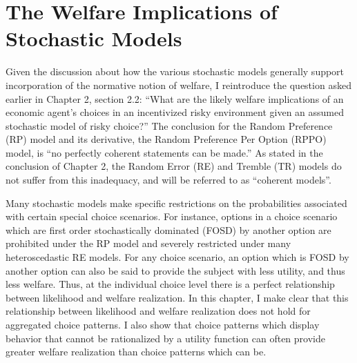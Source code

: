 \documentclass[../main.tex]{subfiles}
\begin{document}
\onehalfspacing
\setcounter{chapter}{2}

\chapter{The Welfare Implications of Stochastic Models}

\lltoc %

Given the discussion about how the various stochastic models generally support incorporation of the normative notion of welfare, I reintroduce the question asked earlier in Chapter 2, section 2.2:
\enquote{What are the likely welfare implications of an economic agent's choices in an incentivized risky environment given an assumed stochastic model of risky choice?}
The conclusion for the Random Preference (RP) model and its derivative, the Random Preference Per Option (RPPO) model, is \enquote{no perfectly coherent statements can be made.}
As stated in the conclusion of Chapter 2, the Random Error (RE) and Tremble (TR) models do not suffer from this inadequacy, and will be referred to as \enquote{coherent models}.

Many stochastic models make specific restrictions on the probabilities associated with certain special choice scenarios.
For instance, options in a choice scenario which are first order stochastically dominated (FOSD) by another option are prohibited under the RP model and severely restricted under many heteroscedastic RE models.
For any choice scenario, an option which is FOSD by another option can also be said to provide the subject with less utility, and thus less welfare.
Thus, at the individual choice level there is a perfect relationship between likelihood and welfare realization.
In this chapter, I make clear that this relationship between likelihood and welfare realization does not hold for aggregated choice patterns.
I also show that choice patterns which display behavior that cannot be rationalized by a utility function can often provide greater welfare realization than choice patterns which can be.
\end{document}
